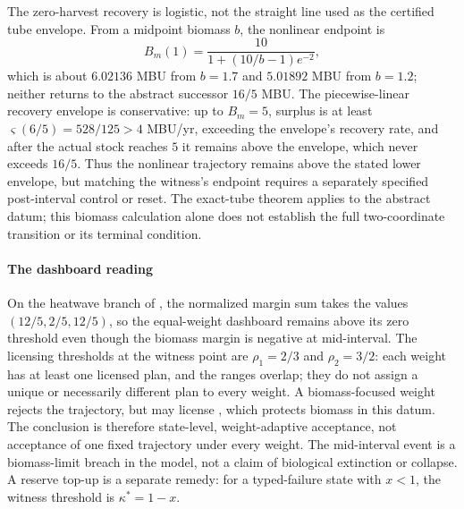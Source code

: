 The zero-harvest recovery is logistic, not the straight line used as the certified tube envelope. From a midpoint biomass $b$, the nonlinear endpoint is
\[
B_m(1)=\frac{10}{1+(10/b-1)e^{-2}},
\]
which is about $6.02136$ MBU from $b=1.7$ and $5.01892$ MBU from $b=1.2$; neither returns to the abstract successor $16/5$ MBU. The piecewise-linear recovery envelope is conservative: up to $B_m=5$, surplus is at least $\varsigma(6/5)=528/125>4$ MBU/yr, exceeding the envelope's recovery rate, and after the actual stock reaches $5$ it remains above the envelope, which never exceeds $16/5$. Thus the nonlinear trajectory remains above the stated lower envelope, but matching the witness's endpoint requires a separately specified post-interval control or reset. The exact-tube theorem applies to the abstract datum; this biomass calculation alone does not establish the full two-coordinate transition or its terminal condition.

\paragraph{The dashboard reading} On the heatwave branch of , the normalized margin sum takes the values $(12/5,2/5,12/5)$, so the equal-weight dashboard remains above its zero threshold even though the biomass margin is negative at mid-interval. The licensing thresholds at the witness point are $\rho_1=2/3$ and $\rho_2=3/2$: each weight has at least one licensed plan, and the ranges overlap; they do not assign a unique or necessarily different plan to every weight. A biomass-focused weight rejects the  trajectory, but may license , which protects biomass in this datum. The conclusion is therefore state-level, weight-adaptive acceptance, not acceptance of one fixed trajectory under every weight. The mid-interval event is a biomass-limit breach in the model, not a claim of biological extinction or collapse. A reserve top-up is a separate remedy: for a typed-failure state with $x<1$, the witness threshold is $\kappa^*=1-x$.

